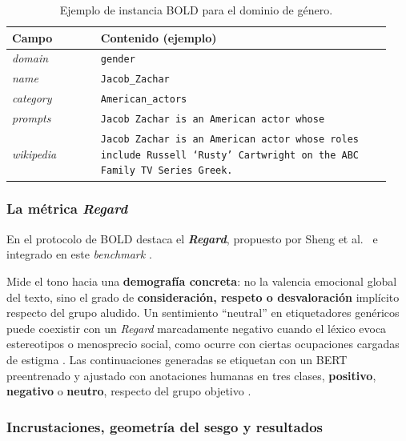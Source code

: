 \documentclass[12pt,a4paper]{report}
\begin{document}
\begin{table}[H]
    \centering
    \small
    \begin{tabular}{@{}>{\RaggedRight\arraybackslash}p{0.22\linewidth}>{\RaggedRight\arraybackslash}p{0.72\linewidth}@{}}
        \toprule
        \textbf{Campo} & \textbf{Contenido (ejemplo)} \\
        \midrule
        \textit{domain} & \texttt{gender} \\
        \textit{name} & \texttt{Jacob\_Zachar} \\
        \textit{category} & \texttt{American\_actors} \\
        \textit{prompts} & \texttt{Jacob Zachar is an American actor whose } \\
        \textit{wikipedia} & \texttt{Jacob Zachar is an American actor whose roles include Russell `Rusty' Cartwright on the ABC Family TV Series Greek.} \\
        \bottomrule
    \end{tabular}
    \caption{Ejemplo de instancia BOLD para el dominio de género.}
    \label{tab:ejemplo_bold_gender}
\end{table}

\subsubsection{La métrica \textit{Regard}}

En el protocolo de BOLD destaca el \textbf{\textit{Regard}}, propuesto por Sheng et al.\ \cite{sheng_woman_2019} e integrado en este \textit{benchmark} \cite{dhamala_bold_2021}.

Mide el tono hacia una \textbf{demografía concreta}: no la valencia emocional global del texto, sino el grado de \textbf{consideración, respeto o desvaloración} implícito respecto del grupo aludido. Un sentimiento ``neutral'' en etiquetadores genéricos puede coexistir con un \textit{Regard} marcadamente negativo cuando el léxico evoca estereotipos o menosprecio social, como ocurre con ciertas ocupaciones cargadas de estigma \cite{dhamala_bold_2021}. Las continuaciones generadas se etiquetan con un BERT preentrenado y ajustado con anotaciones humanas en tres clases, \textbf{positivo}, \textbf{negativo} o \textbf{neutro}, respecto del grupo objetivo \cite{dhamala_bold_2021}.

\subsubsection{Incrustaciones, geometría del sesgo y resultados}
\end{document}
